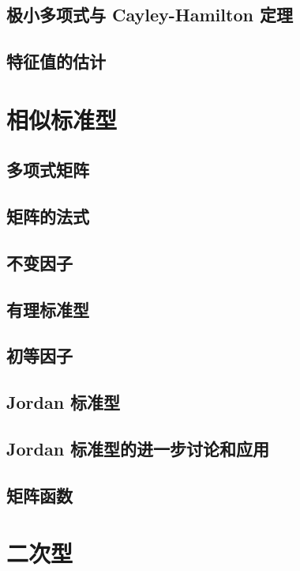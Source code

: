 \documentclass[UTF8,12pt,a4paper,fontset=fandol]{ctexbook}
\begin{document}
\section{极小多项式与 Cayley-Hamilton 定理}

\section{特征值的估计}


\chapter{相似标准型}

\section{多项式矩阵}

\section{矩阵的法式}

\section{不变因子}

\section{有理标准型}

\section{初等因子}

\section{Jordan 标准型}

\section{Jordan 标准型的进一步讨论和应用}

\section{矩阵函数}


\chapter{二次型}
\end{document}
